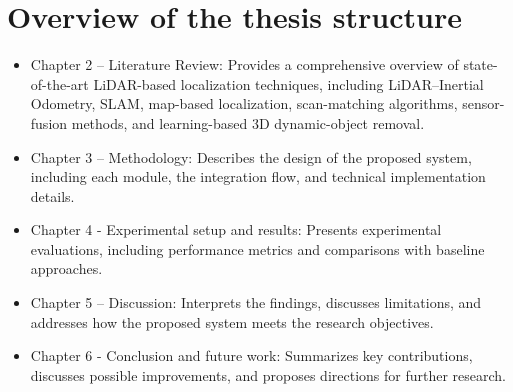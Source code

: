 \section{Overview of the thesis structure}
\begin{itemize}
	\item Chapter 2 – Literature Review: Provides a comprehensive overview of state-of-the-art LiDAR-based localization techniques, including LiDAR–Inertial Odometry, SLAM, map-based localization, scan-matching algorithms, sensor-fusion methods, and learning-based 3D dynamic-object removal.

	\item Chapter 3 – Methodology: Describes the design of the proposed system, including each module, the integration flow, and technical implementation details.
	\item Chapter 4 - Experimental setup and results: Presents experimental evaluations, including performance metrics and comparisons with baseline approaches.
	\item Chapter 5 – Discussion: Interprets the findings, discusses limitations, and addresses how the proposed system meets the research objectives.
	\item Chapter 6 - Conclusion and future work: Summarizes key contributions, discusses possible improvements, and proposes directions for further research.
\end{itemize}





